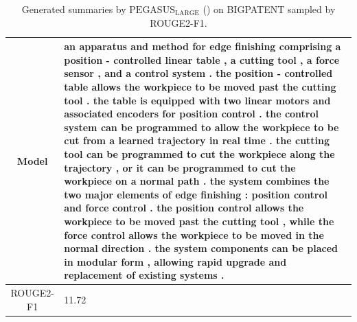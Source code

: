 \begin{table}[bth!]
\begin{tabular}{c|p{}}
\\ \hline
Model & 
an apparatus and method for edge finishing comprising a position - controlled linear table , a cutting tool , a force sensor , and a control system . the position - controlled table allows the workpiece to be moved past the cutting tool . the table is equipped with two linear motors and associated encoders for position control . the control system can be programmed to allow the workpiece to be cut from a learned trajectory in real time . the cutting tool can be programmed to cut the workpiece along the trajectory , or it can be programmed to cut the workpiece on a normal path . the system combines the two major elements of edge finishing : position control and force control . the position control allows the workpiece to be moved past the cutting tool , while the force control allows the workpiece to be moved in the normal direction . the system components can be placed in modular form , allowing rapid upgrade and replacement of existing systems .
\\ \hline
ROUGE2-F1 & 
11.72
\\ \hline
\end{tabular}
\caption{Generated summaries by $\text{PEGASUS}_{\text{LARGE}}$ (\gnews) on BIGPATENT sampled by ROUGE2-F1.}
\end{table}
